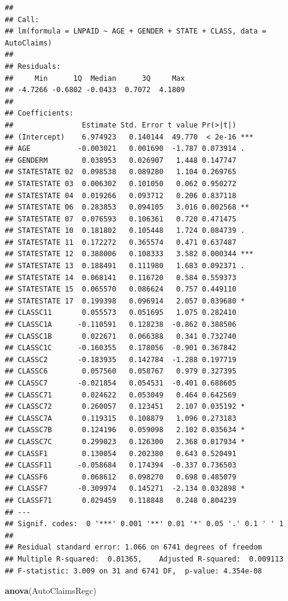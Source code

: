 \documentclass[
]{article}
\newenvironment{Shaded}{\begin{snugshade}}{\end{snugshade}}
\newcommand{\FunctionTok}[1]{\textcolor[rgb]{0.13,0.29,0.53}{\textbf{#1}}}
\newcommand{\NormalTok}[1]{#1}
\begin{document}
\begin{verbatim}
## 
## Call:
## lm(formula = LNPAID ~ AGE + GENDER + STATE + CLASS, data = AutoClaims)
## 
## Residuals:
##     Min      1Q  Median      3Q     Max 
## -4.7266 -0.6802 -0.0433  0.7072  4.1809 
## 
## Coefficients:
##                Estimate Std. Error t value Pr(>|t|)    
## (Intercept)    6.974923   0.140144  49.770  < 2e-16 ***
## AGE           -0.003021   0.001690  -1.787 0.073914 .  
## GENDERM        0.038953   0.026907   1.448 0.147747    
## STATESTATE 02  0.098538   0.089280   1.104 0.269765    
## STATESTATE 03  0.006302   0.101050   0.062 0.950272    
## STATESTATE 04  0.019266   0.093712   0.206 0.837118    
## STATESTATE 06  0.283853   0.094105   3.016 0.002568 ** 
## STATESTATE 07  0.076593   0.106361   0.720 0.471475    
## STATESTATE 10  0.181802   0.105448   1.724 0.084739 .  
## STATESTATE 11  0.172272   0.365574   0.471 0.637487    
## STATESTATE 12  0.388006   0.108333   3.582 0.000344 ***
## STATESTATE 13  0.188491   0.111980   1.683 0.092371 .  
## STATESTATE 14  0.068141   0.116720   0.584 0.559373    
## STATESTATE 15  0.065570   0.086624   0.757 0.449110    
## STATESTATE 17  0.199398   0.096914   2.057 0.039680 *  
## CLASSC11       0.055573   0.051695   1.075 0.282410    
## CLASSC1A      -0.110591   0.128238  -0.862 0.388506    
## CLASSC1B       0.022671   0.066388   0.341 0.732740    
## CLASSC1C      -0.160355   0.178056  -0.901 0.367842    
## CLASSC2       -0.183935   0.142784  -1.288 0.197719    
## CLASSC6        0.057560   0.058767   0.979 0.327395    
## CLASSC7       -0.021854   0.054531  -0.401 0.688605    
## CLASSC71       0.024622   0.053049   0.464 0.642569    
## CLASSC72       0.260057   0.123451   2.107 0.035192 *  
## CLASSC7A       0.119315   0.108879   1.096 0.273183    
## CLASSC7B       0.124196   0.059098   2.102 0.035634 *  
## CLASSC7C       0.299023   0.126300   2.368 0.017934 *  
## CLASSF1        0.130054   0.202380   0.643 0.520491    
## CLASSF11      -0.058684   0.174394  -0.337 0.736503    
## CLASSF6        0.068612   0.098270   0.698 0.485079    
## CLASSF7       -0.309974   0.145271  -2.134 0.032898 *  
## CLASSF71       0.029459   0.118848   0.248 0.804239    
## ---
## Signif. codes:  0 '***' 0.001 '**' 0.01 '*' 0.05 '.' 0.1 ' ' 1
## 
## Residual standard error: 1.066 on 6741 degrees of freedom
## Multiple R-squared:  0.01365,    Adjusted R-squared:  0.009113 
## F-statistic: 3.009 on 31 and 6741 DF,  p-value: 4.354e-08
\end{verbatim}

\begin{Shaded}
\begin{Highlighting}[]
\FunctionTok{anova}\NormalTok{(AutoClaimsRegc)}
\end{Highlighting}
\end{Shaded}
\end{document}
